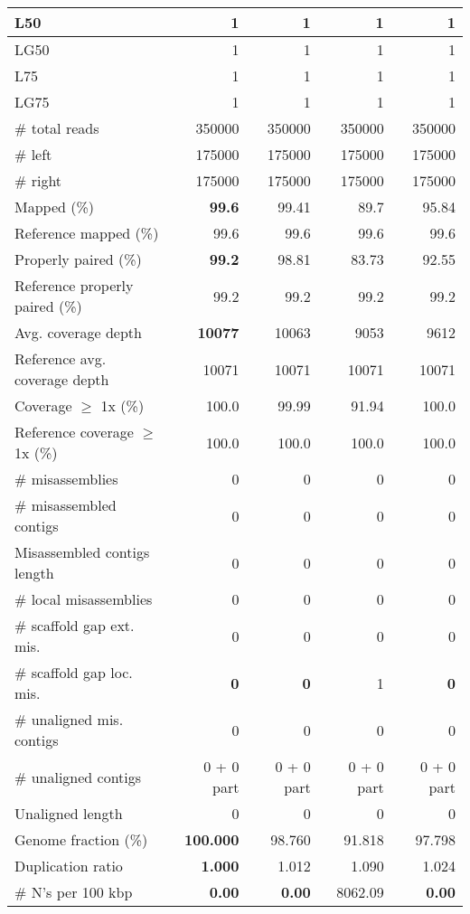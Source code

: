 \documentclass[12pt,a4paper]{article}
\begin{document}
\begin{table}[ht]
\begin{center}
\begin{tabular}{|l*{4}{|r}|}
L50 & 1 & 1 & 1 & 1 \\ \hline
LG50 & 1 & 1 & 1 & 1 \\ \hline
L75 & 1 & 1 & 1 & 1 \\ \hline
LG75 & 1 & 1 & 1 & 1 \\ \hline
\# total reads & 350000 & 350000 & 350000 & 350000 \\ \hline
\# left & 175000 & 175000 & 175000 & 175000 \\ \hline
\# right & 175000 & 175000 & 175000 & 175000 \\ \hline
Mapped (\%) & {\bf 99.6} & 99.41 & 89.7 & 95.84 \\ \hline
Reference mapped (\%) & 99.6 & 99.6 & 99.6 & 99.6 \\ \hline
Properly paired (\%) & {\bf 99.2} & 98.81 & 83.73 & 92.55 \\ \hline
Reference properly paired (\%) & 99.2 & 99.2 & 99.2 & 99.2 \\ \hline
Avg. coverage depth & {\bf 10077} & 10063 & 9053 & 9612 \\ \hline
Reference avg. coverage depth & 10071 & 10071 & 10071 & 10071 \\ \hline
Coverage $\geq$ 1x (\%) & 100.0 & 99.99 & 91.94 & 100.0 \\ \hline
Reference coverage $\geq$ 1x (\%) & 100.0 & 100.0 & 100.0 & 100.0 \\ \hline
\# misassemblies & 0 & 0 & 0 & 0 \\ \hline
\# misassembled contigs & 0 & 0 & 0 & 0 \\ \hline
Misassembled contigs length & 0 & 0 & 0 & 0 \\ \hline
\# local misassemblies & 0 & 0 & 0 & 0 \\ \hline
\# scaffold gap ext. mis. & 0 & 0 & 0 & 0 \\ \hline
\# scaffold gap loc. mis. & {\bf 0} & {\bf 0} & 1 & {\bf 0} \\ \hline
\# unaligned mis. contigs & 0 & 0 & 0 & 0 \\ \hline
\# unaligned contigs & 0 + 0 part & 0 + 0 part & 0 + 0 part & 0 + 0 part \\ \hline
Unaligned length & 0 & 0 & 0 & 0 \\ \hline
Genome fraction (\%) & {\bf 100.000} & 98.760 & 91.818 & 97.798 \\ \hline
Duplication ratio & {\bf 1.000} & 1.012 & 1.090 & 1.024 \\ \hline
\# N's per 100 kbp & {\bf 0.00} & {\bf 0.00} & 8062.09 & {\bf 0.00} \\ \hline

\end{tabular}
\end{center}
\end{table}
\end{document}
